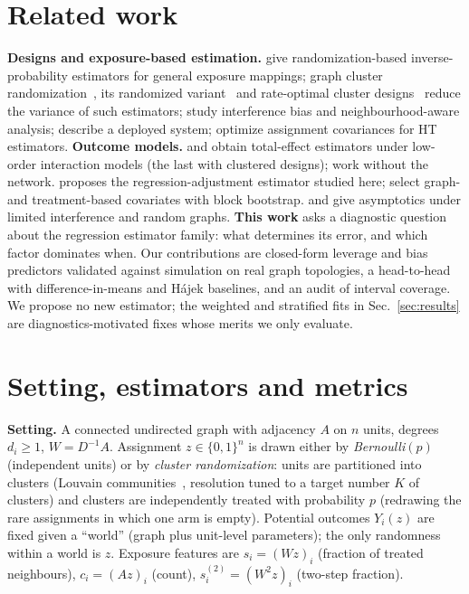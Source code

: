 \section{Related work}
\label{sec:related}
\textbf{Designs and exposure-based estimation.} \citet{aronow2017estimating} give randomization-based inverse-probability estimators for general exposure mappings; graph cluster randomization~\citep{ugander2013graph}, its randomized variant~\citep{ugander2023randomized} and rate-optimal cluster designs~\citep{leung2022rate} reduce the variance of such estimators; \citet{eckles2017design} study interference bias and neighbourhood-aware analysis; \citet{karrer2021network} describe a deployed system; \citet{chen2023optimized} optimize assignment covariances for HT estimators. \textbf{Outcome models.} \citet{cortez2022staggered,cortez2023exploiting} and \citet{eichhorn2024low} obtain total-effect estimators under low-order interaction models (the last with clustered designs); \citet{yu2022estimating} work without the network. \citet{chin2019regression} proposes the regression-adjustment estimator studied here; \citet{han2023model} select graph- and treatment-based covariates with block bootstrap. \citet{savje2021average} and \citet{li2022random} give asymptotics under limited interference and random graphs. \textbf{This work} asks a diagnostic question about the regression estimator family: what determines its error, and which factor dominates when. Our contributions are closed-form leverage and bias predictors validated against simulation on real graph topologies, a head-to-head with difference-in-means and H\'ajek baselines, and an audit of interval coverage. We propose no new estimator; the weighted and stratified fits in Sec.~\ref{sec:results} are diagnostics-motivated fixes whose merits we only evaluate.

\section{Setting, estimators and metrics}
\label{sec:setting}
\textbf{Setting.} A connected undirected graph with adjacency $A$ on $n$ units, degrees $d_i\ge1$, $W=D^{-1}A$. Assignment $z\in\{0,1\}^n$ is drawn either by \emph{Bernoulli}$(p)$ (independent units) or by \emph{cluster randomization}: units are partitioned into clusters (Louvain communities~\citep{blondel2008fast}, resolution tuned to a target number $K$ of clusters) and clusters are independently treated with probability $p$ (redrawing the rare assignments in which one arm is empty). Potential outcomes $Y_i(z)$ are fixed given a ``world'' (graph plus unit-level parameters); the only randomness within a world is $z$. Exposure features are $s_i=(Wz)_i$ (fraction of treated neighbours), $c_i=(Az)_i$ (count), $s^{(2)}_i=(W^2z)_i$ (two-step fraction).

